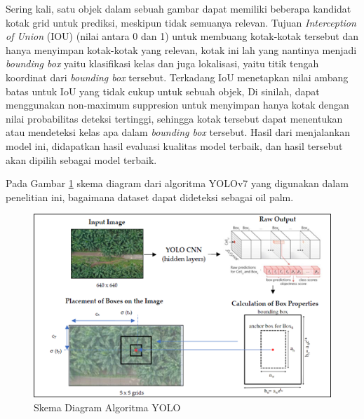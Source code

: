 Sering kali, satu objek dalam sebuah gambar dapat memiliki beberapa kandidat kotak grid untuk prediksi, meskipun tidak semuanya relevan. Tujuan \textit{Interception of Union} (IOU) (nilai antara 0 dan 1) untuk membuang kotak-kotak tersebut dan hanya menyimpan kotak-kotak yang relevan, kotak ini lah yang nantinya menjadi \textit{bounding box} yaitu klasifikasi kelas dan juga lokalisasi, yaitu titik tengah koordinat dari \textit{bounding box} tersebut. Terkadang IoU menetapkan nilai ambang batas untuk IoU yang tidak cukup untuk sebuah objek, Di sinilah, dapat menggunakan non-maximum suppresion untuk menyimpan hanya kotak dengan nilai probabilitas deteksi tertinggi, sehingga kotak tersebut dapat menentukan atau mendeteksi kelas apa dalam \textit{bounding box} tersebut. Hasil dari menjalankan model ini, didapatkan hasil evaluasi kualitas model terbaik, dan hasil tersebut akan dipilih sebagai model terbaik.

Pada Gambar \ref{img:Skema-Diagram-Algoritma-YOLO} skema diagram dari algoritma YOLOv7 yang digunakan dalam penelitian ini, bagaimana dataset dapat dideteksi sebagai oil palm.

\begin{figure}[H]
	\vspace{-0.1cm}
	\begin{center}
		\includegraphics[width=1\columnwidth]{bab3/Gambar/Picture14.png}
	\end{center}
	\vspace{-0.2cm}
	\captionsetup{justification=centering}
	\caption{Skema Diagram Algoritma YOLO}\label{img:Skema-Diagram-Algoritma-YOLO}
\end{figure}

